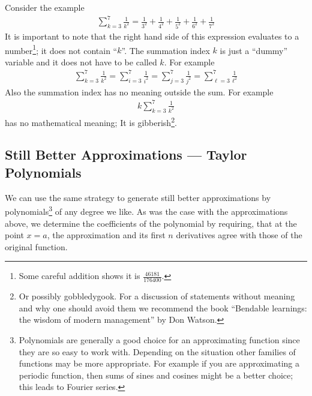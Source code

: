 Consider the example
\begin{align*}
\sum_{k=3}^7 \frac{1}{k^2}=\frac{1}{3^2}+\frac{1}{4^2}+\frac{1}{5^2}+
\frac{1}{6^2}+\frac{1}{7^2}
\end{align*}
It is important to note that the right hand side of this expression evaluates to a
number\footnote{Some careful addition shows it is $\frac{46181}{176400}$.}; it does not
contain ``$k$''.  The summation index $k$  is just a ``dummy'' variable and
it does not have to be called $k$. For example
\begin{align*}
  \sum_{k=3}^7 \frac{1}{k^2}
  =\sum_{i=3}^7 \frac{1}{i^2}
  =\sum_{j=3}^7 \frac{1}{j^2}
  =\sum_{\ell=3}^7 \frac{1}{\ell^2}
\end{align*}
Also the summation index has no meaning outside the sum. For
example
\begin{align*}
k\sum_{k=3}^7 \frac{1}{k^2}
\end{align*}
has no mathematical meaning; It is gibberish\footnote{Or possibly gobbledygook. For a
discussion of statements without meaning and why one should avoid them we recommend the
book ``Bendable learnings: the wisdom of modern management'' by Don Watson.}.



\subsection{Still Better Approximations --- Taylor Polynomials}
\label{ssec_taylor_poly}
We can use the same strategy to generate still better approximations by
polynomials\footnote{Polynomials are generally a good choice for an approximating
function since they are so easy to work with. Depending on the situation other families
of functions may be more appropriate. For example if you are approximating a periodic
function, then sums of sines and cosines might be a better choice; this leads to Fourier
series.} of any degree we like. As was the case with the approximations above, we
determine the coefficients of the polynomial by requiring, that at the point
$x=a$, the approximation and its first $n$ derivatives agree with those of the
original function.

